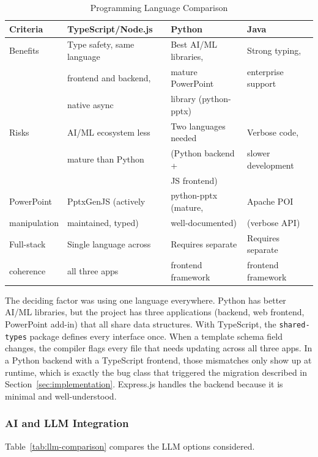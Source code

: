 \begin{table}[H]
\centering
\begin{tabular}{|l|l|l|l|}
\hline
\rowcolor{gray!20} \textbf{Criteria} & \textbf{TypeScript/Node.js} & \textbf{Python} & \textbf{Java} \\
\hline
Benefits & Type safety, same language & Best AI/ML libraries, & Strong typing, \\
 & frontend and backend, & mature PowerPoint & enterprise support \\
 & native async & library (python-pptx) & \\
\hline
Risks & AI/ML ecosystem less & Two languages needed & Verbose code, \\
 & mature than Python & (Python backend + & slower development \\
 & & JS frontend) & \\
\hline
PowerPoint & PptxGenJS (actively & python-pptx (mature, & Apache POI \\
manipulation & maintained, typed) & well-documented) & (verbose API) \\
\hline
Full-stack & Single language across & Requires separate & Requires separate \\
coherence & all three apps & frontend framework & frontend framework \\
\hline
\end{tabular}
\caption{Programming Language Comparison}
\label{tab:lang-comparison}
\end{table}

The deciding factor was using one language everywhere. Python has better AI/ML libraries, but the project has three applications (backend, web frontend, PowerPoint add-in) that all share data structures. With TypeScript, the \texttt{shared-types} package defines every interface once. When a template schema field changes, the compiler flags every file that needs updating across all three apps. In a Python backend with a TypeScript frontend, those mismatches only show up at runtime, which is exactly the bug class that triggered the migration described in Section~\ref{sec:implementation}. Express.js handles the backend because it is minimal and well-understood.

\subsubsection{AI and LLM Integration}

Table~\ref{tab:llm-comparison} compares the LLM options considered.

